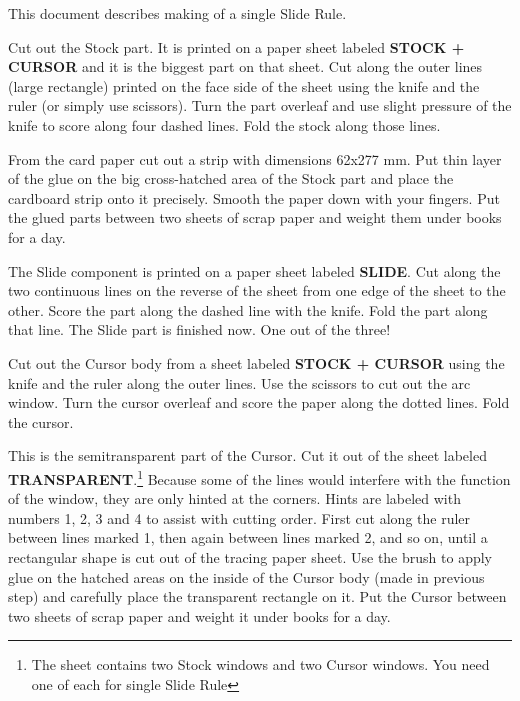\begin{multicols*}{3}
{\vfill\columnbreak
  This document describes making of a single Slide Rule.


Cut out the Stock part. It is printed on a paper sheet labeled \textbf{STOCK + CURSOR} and it is the biggest part on that sheet. Cut along the outer lines (large rectangle) printed on the face side of the sheet using the knife and the ruler (or simply use scissors). Turn the part overleaf and use slight pressure of the knife to score along four dashed lines. Fold the stock along those lines.


From the card paper cut out a strip with dimensions 62x277 mm. Put thin layer of the glue on the big cross-hatched area of the Stock part and place the cardboard strip onto it precisely. Smooth the paper down with your fingers. Put the glued parts between two sheets of scrap paper and weight them under books for a day.


The Slide component is printed on a paper sheet labeled \textbf{SLIDE}. Cut along the two continuous lines on the reverse of the sheet from one edge of the sheet to the other. Score the part along the dashed line with the knife. Fold the part along that line. The Slide part is finished now. One out of the three!


Cut out the Cursor body from a sheet labeled \textbf{STOCK + CURSOR} using the knife and the ruler along the outer lines. Use the scissors to cut out the arc window. Turn the cursor overleaf and score the paper along the dotted lines. Fold the cursor.


This is the semitransparent part of the Cursor. Cut it out of the sheet labeled \textbf{TRANSPARENT}.\footnote{The sheet contains two Stock windows and two Cursor windows. You need one of each for single Slide Rule} Because some of the lines would interfere with the function of the window, they are only hinted at the corners. Hints are labeled with numbers 1, 2, 3 and 4 to assist with cutting order. First cut along the ruler between lines marked 1, then again between lines marked 2, and so on, until a rectangular shape is cut out of the tracing paper sheet. Use the brush to apply glue on the hatched areas on the inside of the Cursor body (made in previous step) and carefully place the transparent rectangle on it. Put the Cursor between two sheets of scrap paper and weight it under books for a day.

}
\end{multicols*}
